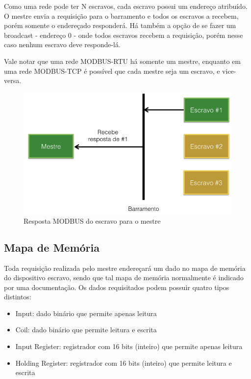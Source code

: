 Como uma rede pode ter N escravos, cada escravo possui um endereço atribuído. O mestre envia a requisição para o barramento e todos os escravos a recebem, porém somente o endereçado responderá. Há também a opção de se fazer um broadcast - endereço 0 - onde todos escravos recebem a requisição, porém nesse caso nenhum escravo deve responde-lá.

Vale notar que uma rede MODBUS-RTU há somente um mestre, enquanto em uma rede MODBUS-TCP é possível que cada mestre seja um escravo, e vice-versa.

\begin{figure}[H]
        \begin{center}
                \includegraphics[width=\textwidth,natwidth=1024,natheight=768]{assets/images/modbus-req-2.png}
                \caption{Resposta MODBUS do escravo para o mestre}
                \label{fig:modbus-req-2}
        \end{center}
\end{figure}

\subsection{Mapa de Memória}

Toda requisição realizada pelo mestre endereçará um dado no mapa de memória do dispositivo escravo, sendo que tal mapa de memória normalmente é indicado por uma documentação. Os dados requisitados podem possuir quatro tipos distintos:

\begin{itemize}
  \item Input: dado binário que permite apenas leitura
  \item Coil: dado binário que permite leitura e escrita
  \item Input Register: registrador com 16 bits (inteiro) que permite apenas leitura
  \item Holding Register: registrador com 16 bits (inteiro) que permite leitura e escrita
\end{itemize}

